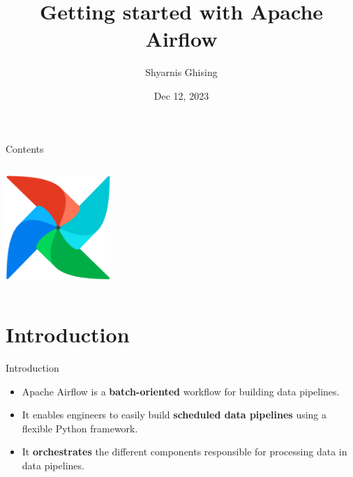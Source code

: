 \documentclass[14pt, aspectratio=169]{beamer}
\begin{document}
	\author{Shyarnis Ghising}
	\title{Getting started with Apache Airflow}
	\date{Dec 12, 2023}
	\subject{COMP 482}

	\begin{frame}[plain]
		\maketitle
	\end{frame}
	
	\begin{frame}[fragile]{Contents}
		\begin{columns}
			\tableofcontents
			
			\includegraphics[width=4cm]{airflow.png}
		\end{columns}
	\end{frame}

	\section{Introduction}
	\begin{frame}{Introduction}
		\begin{itemize}
			\item<1-> Apache Airflow is a \textbf{batch-oriented} workflow for building data pipelines.
			\item<2-> It enables engineers to easily build \textbf{scheduled data pipelines} using a flexible Python framework.
			\item<3-> It \textbf{orchestrates} the different components responsible for processing data in data pipelines\cite{harenslak2020}.
		\end{itemize}
	\end{frame}
 
\end{document}
